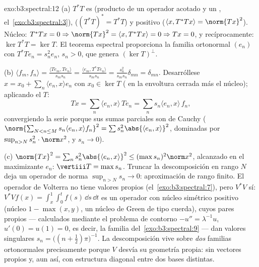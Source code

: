\begin{solution}{exo:b3:spectral:12}
(a) $T^*T$ es  (producto de un
operador acotado y un , el~\cref{exo:b3:spectral:3}),
 ($(T^*T)^* = T^*T$) y
positivo ($\langle x, T^*Tx\rangle =
\norm{Tx}^2$). Núcleo: $T^*Tx = 0 \Rightarrow \norm{Tx}^2 =
\langle x, T^*Tx\rangle = 0 \Rightarrow Tx = 0$, y recíprocamente:
$\ker T^*T = \ker T$. El teorema espectral proporciona la familia
ortonormal $(e_n)$ con $T^*Te_n = s_n^2e_n$, $s_n > 0$, que genera
$(\ker T)^\perp$.

(b) $\langle f_m, f_n\rangle = \frac{\langle Te_m,
Te_n\rangle}{s_ms_n} = \frac{\langle e_m,
T^*Te_n\rangle}{s_ms_n} = \frac{s_n^2}{s_ms_n}\delta_{mn} =
\delta_{mn}$. Desarróllese $x = x_0 + \sum_n\langle e_n, x\rangle
e_n$ con $x_0 \in \ker T$ ( en
la envoltura cerrada más el núcleo); aplicando el
 $T$:
\[
Tx = \sum_n\langle e_n, x\rangle\,Te_n =
\sum_ns_n\langle e_n, x\rangle\,f_n,
\]
convergiendo la serie porque sus sumas parciales son de Cauchy
($\norm{\sum_{N<n\leq M}s_n\langle e_n, x\rangle f_n}^2 =
\sum s_n^2\abs{\langle e_n, x\rangle}^2$, dominadas por
$\sup_{n>N}s_n^2\cdot\norm x^2$, y $s_n \to 0$).

(c) $\norm{Tx}^2 = \sum_ns_n^2\abs{\langle e_n, x\rangle}^2
\leq (\max s_n)^2\norm x^2$, alcanzado en el maximizante $e_n$:
$\vertiii T = \max s_n$. Truncar la descomposición en rango $N$ deja un
operador de norma $\sup_{n>N}s_n \to 0$: aproximación de rango finito.
El operador de Volterra no tiene valores propios
(el~\cref{exo:b3:spectral:7}), pero $V^*V$ sí:
$V^*Vf(x) = \int_x^1\int_0^tf(s)\,\dd s\,\dd t$ es un operador con
núcleo simétrico positivo (núcleo $1 - \max(x,y)$, un núcleo de Green de
tipo cuerda), cuyos pares propios --- calculados mediante el problema de
contorno $-u'' = \lambda^{-1}u$, $u'(0)
= u(1) = 0$, es decir, la familia del~\cref{exo:b3:spectral:9} --- dan
valores singulares $s_n = \bigl((n + \frac12)\pi\bigr)^{-1}$. La
descomposición vive sobre \emph{dos} familias ortonormales precisamente
porque $V$ desvía su geometría propia: sin vectores propios y, aun así,
con estructura diagonal  entre
dos bases distintas.
\end{solution}

